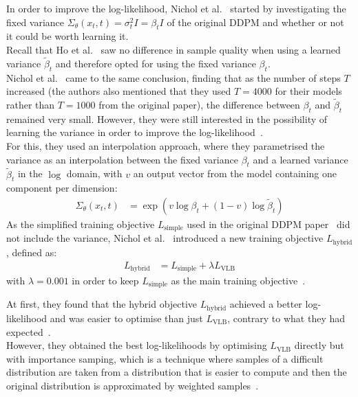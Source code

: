 \documentclass{article}
\numberwithin{equation}{section}
\numberwithin{figure}{section}
\begin{document}
In order to improve the log-likelihood, Nichol et al.~\cite{nichol2021improved} started by investigating the fixed variance $\Sigma_\theta (x_t, t) = \sigma_t^2 I = \beta_t I$ of the original DDPM and whether or not it could be worth learning it. \\
Recall that Ho et al.~\cite{ho2020denoising} saw no difference in sample quality when using a learned variance $\tilde{\beta}_t$ and therefore opted for using the fixed variance $\beta_t$. \\
Nichol et al.~\cite{nichol2021improved} came to the same conclusion, finding that as the number of steps $T$ increased (the authors also mentioned that they used $T = 4000$ for their models rather than $T = 1000$ from the original paper), the difference between $\beta_t$ and $\tilde{\beta}_t$ remained very small. However, they were still interested in the possibility of learning the variance in order to improve the log-likelihood~\cite{nichol2021improved}. \\
For this, they used an interpolation approach, where they parametrised the variance as an interpolation between the fixed variance $\beta_t$ and a learned variance $\tilde{\beta}_t$ in the $\log$ domain, with $v$ an output vector from the model containing one component per dimension:
\begin{align}
  \Sigma_\theta (x_t, t) &= \exp \left( v \log \beta_t + (1 - v) \log \tilde{\beta}_t \right)
\end{align}
As the simplified training objective $L_{\text{simple}}$ used in the original DDPM paper~\cite{ho2020denoising} did not include the variance, Nichol et al.~\cite{nichol2021improved} introduced a new training objective $L_{\text{hybrid}}$, defined as:
\begin{align}
  L_{\text{hybrid}} &= L_{\text{simple}} + \lambda L_{\text{VLB}}
\end{align}
with $\lambda = 0.001$ in order to keep $L_{\text{simple}}$ as the main training objective~\cite{nichol2021improved}.

At first, they found that the hybrid objective $L_{\text{hybrid}}$ achieved a better log-likelihood and was easier to optimise than just $L_{\text{VLB}}$, contrary to what they had expected~\cite{nichol2021improved}. \\
However, they obtained the best log-likelihoods by optimising $L_{\text{VLB}}$ directly but with importance samping, which is a technique where samples of a difficult distribution are taken from a distribution that is easier to compute and then the original distribution is approximated by weighted samples~\cite{nichol2021improved}.
\end{document}
